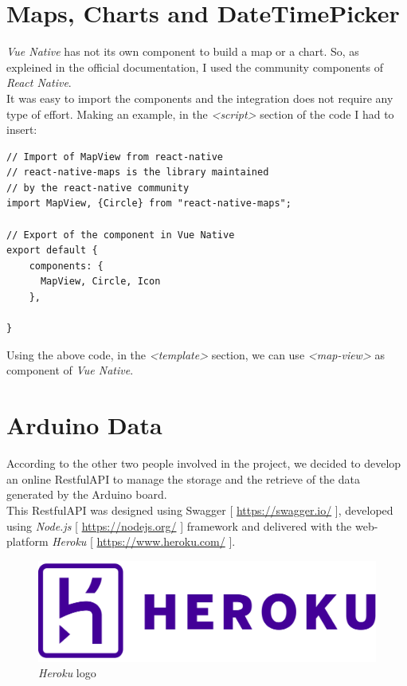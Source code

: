 \section{Maps, Charts and DateTimePicker}
\textit{Vue Native} has not its own component to build a map or a chart. So, as expleined in the official documentation, I used the community components of \textit{React Native}.\\

It was easy to import the components and the integration does not require any type of effort. Making an example, in the \textit{<script>} section of the code I had to insert:

\medskip
\begin{lstlisting}[style=htmlcssjs]
// Import of MapView from react-native
// react-native-maps is the library maintained
// by the react-native community
import MapView, {Circle} from "react-native-maps";

// Export of the component in Vue Native
export default {
    components: {
      MapView, Circle, Icon
    },
    
}
\end{lstlisting}

Using the above code, in the \textit{<template>} section, we can use \textit{<map-view>} as component of \textit{Vue Native}.

\section{Arduino Data}
According to the other two people involved in the project, we decided to develop an online RestfulAPI to manage the storage and the retrieve of the data generated by the Arduino board.\\

This RestfulAPI was designed using Swagger [ \url{https://swagger.io/} ], developed using \textit{Node.js} [ \url{https://nodejs.org/} ] framework and delivered with the web-platform \textit{Heroku} [ \url{https://www.heroku.com/} ].\\

\begin{figure}[h]
\begin{center}
  \includegraphics[width=.5\textwidth]{img/logos/logo_heroku.png}
  \hspace{0.05\linewidth}
  \centering
  \caption{\textit{Heroku} logo}
  \label{img:logo_heroku}
\end{center}
\end{figure}

